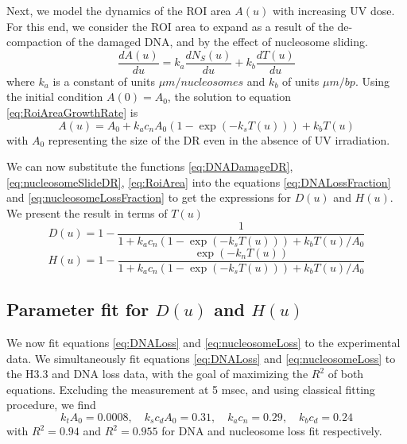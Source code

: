 \documentclass[12pt]{article}
\begin{document}
	Next, we model the dynamics of the ROI area $A(u)$ with increasing UV
	dose. For this end, we consider the ROI area to expand as a result of the de-compaction of the damaged DNA, and by the effect of nucleosome sliding. 			
	\begin{equation}\label{eq:RoiAreaGrowthRate}
	\frac{dA(u)}{du}=k_a\frac{dN_S(u)}{du}+k_b\frac{dT(u)}{du}
	\end{equation}
	where $k_a$ is a constant of units $\mu m/ nucleosomes$ and $k_b$ of units $\mu m/ bp$. Using the initial condition $A(0) = A_0$, the solution to equation \eqref{eq:RoiAreaGrowthRate} is
	\begin{equation}\label{eq:RoiArea}
	A(u) = A_0+ k_ac_nA_0\left(1-\exp(-k_sT(u))\right)+k_bT(u)
	\end{equation}
	 with $A_0$ representing the size of the DR even in the absence of UV irradiation.
	 
	We can now substitute the functions \eqref{eq:DNADamageDR}, \eqref{eq:nucleosomeSlideDR}, \eqref{eq:RoiArea} into the equations \eqref{eq:DNALossFraction} and \eqref{eq:nucleosomeLossFraction} to get the expressions for $D(u)$ and $H(u)$. We present the result in terms of $T(u)$
	\begin{equation}\label{eq:DNALoss}
	D(u) = 1-\frac{1}{1+ k_ac_n\left(1-\exp(-k_sT(u))\right)+k_bT(u)/A_0} 
	\end{equation}
	\begin{equation}\label{eq:nucleosomeLoss}
		H(u) = 1- \frac{\exp(-k_nT(u))}{1+ k_ac_n\left(1-\exp(-k_sT(u))\right)+k_bT(u)/A_0}
	\end{equation}
	
	\subsection{Parameter fit for $D(u)$ and $H(u)$}\label{subsection:parameterFit}
	We now fit equations \eqref{eq:DNALoss}  and \eqref{eq:nucleosomeLoss} to the experimental data. We simultaneously fit equations \eqref{eq:DNALoss}  and \eqref{eq:nucleosomeLoss} to the H3.3 and DNA loss data, with the goal of maximizing the $R^2$ of both equations. Excluding the measurement at 5 msec, and using classical fitting procedure, we find
	\begin{equation*}
	k_tA_0 = 0.0008, \quad k_sc_dA_0 = 0.31,\quad k_ac_n = 0.29, \quad k_bc_d = 0.24
	\end{equation*}
	with $R^2 = 0.94$ and $R^2 = 0.955$ for DNA and nucleosome loss fit respectively.
	
\end{document}
